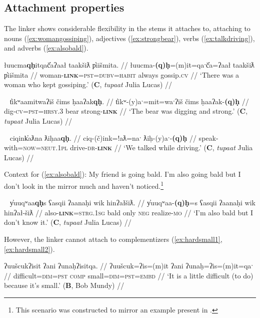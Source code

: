 \subsection{Attachment properties} \label{ch:link:attach}

The linker shows considerable flexibility in the stems it attaches to, attaching to nouns (\ref{ex:womangossiping}), adjectives (\ref{ex:strongbear}), verbs (\ref{ex:talkdriving}), and adverbs (\ref{ex:alsobald}).

\ex \label{ex:womangossiping}
\begingl
\glpreamble łuucma\textbf{qḥ}itqač̓aʔaał taakšiƛ p̓iišmita. //
\gla łuucma-\textbf{(q)ḥ}=(m)it=qaˑč̓a=ʔaał taakšiƛ p̓iišmita //
\glb woman-\textbf{\textsc{link}}=\textsc{pst}=\textsc{dubv}=\textsc{habit} always gossip.\textsc{cv} //
\glft `There was a woman who kept gossiping.' (\textbf{C}, \textit{tupaat} Julia Lucas) //
\endgl
\xe

\ex~ \label{ex:strongbear}
\begingl
\glpreamble t̓ikʷaamitwaʔiš čims ḥaaʔak\textbf{qḥ}. //
\gla t̓ikʷ-(y)aˑ=mit=waˑʔiš čims ḥaaʔak-\textbf{(q)ḥ} //
\glb dig-\textsc{cv}=\textsc{pst}=\textsc{hrsy.3} bear strong-\textbf{\textsc{link}} //
\glft `The bear was digging and strong.' (\textbf{C}, \textit{tupaat} Julia Lucas) //
\endgl
\xe

\ex~ \label{ex:talkdriving}
\begingl
\glpreamble ciqink̓aƛna ƛiḥaa\textbf{qḥ}. //
\gla ciq-(č)ink=!aƛ=naˑ ƛiḥ-(y)aˑ-\textbf{(q)ḥ} //
\glb speak-with=\textsc{now}=\textsc{neut.1pl} drive-\textsc{dr}-\textbf{\textsc{link}} //
\glft `We talked while driving.' (\textbf{C}, \textit{tupaat} Julia Lucas) //
\endgl
\xe

\noindent Context for (\ref{ex:alsobald}): My friend is going bald. I'm also going bald but I don't look in the mirror much and haven't noticed.\footnote{This scenario was constructed to mirror an example present in \citet{sapir1939}.}


\ex~ \label{ex:alsobald}
\begingl
\glpreamble y̓uuqʷaa\textbf{qḥ}s ʕasqii ʔaanaḥi wik hinʔałšiƛ. //
\gla y̓uuqʷaa-\textbf{(q)ḥ}=s ʕasqii ʔaanaḥi wik hinʔał-šiƛ //
\glb also-\textbf{\textsc{link}}=\textsc{strg.1sg} bald only \textsc{neg} realize-\textsc{mo} //
\glft `I'm also bald but I don't know it.' (\textbf{C}, \textit{tupaat} Julia Lucas) //
\endgl
\xe

However, the linker cannot attach to complementizers (\ref{ex:hardsmall1}, \ref{ex:hardsmall2}).

\ex \label{ex:hardsmall1}
\begingl
\glpreamble ʔuušcukʔisit ʔani ʔunaḥʔisitqa. //
\gla ʔuušcuk=ʔis=(m)it ʔani ʔunaḥ=ʔis=(m)it=qaˑ //
\glb difficult=\textsc{dim}=\textsc{pst} \textsc{comp} small=\textsc{dim}=\textsc{pst}=\textsc{embd} //
\glft `It is a little difficult (to do) because it's small.' (\textbf{B}, Bob Mundy) //
\endgl
\xe

